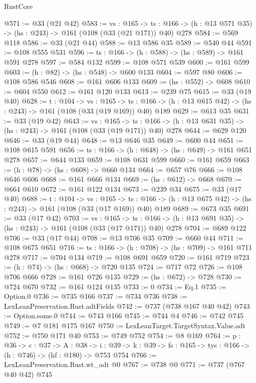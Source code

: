 \begin{lexlean}{RustCore}
\begin{coremodule}
@571 := @33 (@21 @42)
@583 := {vs : @165} ->
  {ts : @166} -> (h : @13 @571 @35) -> (hs : @243) -> @161 (@108 (@33 (@21 @171)) @40) @278
@584 := @569 @118
@586 := @33 (@21 @44)
@588 := @13 @586 @35
@589 := @540 @44
@591 := @108 @555 @531
@596 := {ts : @166} -> (h : @588) -> (hs : @589) -> @161 @591 @278
@597 := @584 @132
@599 := @108 @571 @539
@600 := @161 @599
@603 := (h : @82) -> (hs : @548) -> @600 @133
@604 := @597 @80
@606 := @108 @586 @546
@608 := @161 @606 @133
@609 := (hs : @552) -> @608
@610 := @604 @550
@612 := @161 @120 @133
@613 := @239 @75
@615 := @33 (@19 @40)
@628 := {t : @104} ->
  {vs : @165} ->
  {ts : @166} -> (h : @13 @615 @42) -> (hs : @243) -> @161 (@108 (@33 (@19 @169)) @40) @189
@629 := @613 @35
@631 := @33 (@19 @42)
@643 := {vs : @165} ->
  {ts : @166} -> (h : @13 @631 @35) -> (hs : @243) -> @161 (@108 (@33 (@19 @171)) @40) @278
@644 := @629 @120
@646 := @33 (@19 @44)
@648 := @13 @646 @35
@649 := @600 @44
@651 := @108 @615 @591
@656 := {ts : @166} -> (h : @648) -> (hs : @649) -> @161 @651 @278
@657 := @644 @133
@659 := @108 @631 @599
@660 := @161 @659
@663 := (h : @78) -> (hs : @608) -> @660 @134
@664 := @657 @76
@666 := @108 @646 @606
@668 := @161 @666 @134
@669 := (hs : @612) -> @668
@670 := @664 @610
@672 := @161 @122 @134
@673 := @239 @34
@675 := @33 (@17 @40)
@688 := {t : @104} ->
  {vs : @165} ->
  {ts : @166} -> (h : @13 @675 @42) -> (hs : @243) -> @161 (@108 (@33 (@17 @169)) @40) @189
@689 := @673 @35
@691 := @33 (@17 @42)
@703 := {vs : @165} ->
  {ts : @166} -> (h : @13 @691 @35) -> (hs : @243) -> @161 (@108 (@33 (@17 @171)) @40) @278
@704 := @689 @122
@706 := @33 (@17 @44)
@708 := @13 @706 @35
@709 := @660 @44
@711 := @108 @675 @651
@716 := {ts : @166} -> (h : @708) -> (hs : @709) -> @161 @711 @278
@717 := @704 @134
@719 := @108 @691 @659
@720 := @161 @719
@723 := (h : @74) -> (hs : @668) -> @720 @135
@724 := @717 @72
@726 := @108 @706 @666
@728 := @161 @726 @135
@729 := (hs : @672) -> @728
@730 := @724 @670
@732 := @161 @124 @135
@733 := 0
@734 := Eq.{1}
@735 := Option.{0}
@736 := @735 @166
@737 := @734 @736
@738 := LexLeanPreservation.Rust.adtFields
@742 := @737 (@738 @167 @40 @42)
@743 := Option.some.{0}
@744 := @743 @166
@745 := @744 @4
@746 := @742 @745
@749 := @7 @181 @175 @167
@750 := LexLeanTarget.TargetSyntax.Value.adt
@752 := @750 @171 @40
@753 := @749 @752
@754 := @8 @169
@764 := {p : @36} ->
  {c : @37} ->
  {A : @38} ->
  {i : @39} -> {k : @39} -> {fs : @165} -> {tys : @166} -> (h : @746) -> (hf : @180) -> @753 @754
@766 := LexLeanPreservation.Rust.wt_adt @0
@767 := @738 @0
@771 := @737 (@767 @40 @42) @745

\end{coremodule}
\end{lexlean}
